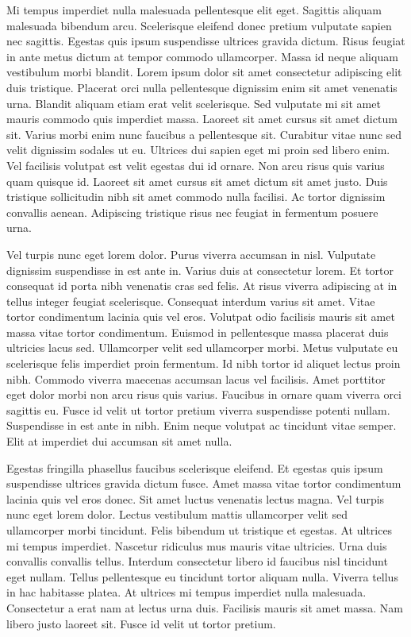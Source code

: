 \documentclass[11pt,a4paper]{article}
\begin{document}
Mi tempus imperdiet nulla malesuada pellentesque elit eget. Sagittis aliquam malesuada bibendum arcu. Scelerisque eleifend donec pretium vulputate sapien nec sagittis. Egestas quis ipsum suspendisse ultrices gravida dictum. Risus feugiat in ante metus dictum at tempor commodo ullamcorper. Massa id neque aliquam vestibulum morbi blandit. Lorem ipsum dolor sit amet consectetur adipiscing elit duis tristique. Placerat orci nulla pellentesque dignissim enim sit amet venenatis urna. Blandit aliquam etiam erat velit scelerisque. Sed vulputate mi sit amet mauris commodo quis imperdiet massa. Laoreet sit amet cursus sit amet dictum sit. Varius morbi enim nunc faucibus a pellentesque sit. Curabitur vitae nunc sed velit dignissim sodales ut eu. Ultrices dui sapien eget mi proin sed libero enim. Vel facilisis volutpat est velit egestas dui id ornare. Non arcu risus quis varius quam quisque id. Laoreet sit amet cursus sit amet dictum sit amet justo. Duis tristique sollicitudin nibh sit amet commodo nulla facilisi. Ac tortor dignissim convallis aenean. Adipiscing tristique risus nec feugiat in fermentum posuere urna.

Vel turpis nunc eget lorem dolor. Purus viverra accumsan in nisl. Vulputate dignissim suspendisse in est ante in. Varius duis at consectetur lorem. Et tortor consequat id porta nibh venenatis cras sed felis. At risus viverra adipiscing at in tellus integer feugiat scelerisque. Consequat interdum varius sit amet. Vitae tortor condimentum lacinia quis vel eros. Volutpat odio facilisis mauris sit amet massa vitae tortor condimentum. Euismod in pellentesque massa placerat duis ultricies lacus sed. Ullamcorper velit sed ullamcorper morbi. Metus vulputate eu scelerisque felis imperdiet proin fermentum. Id nibh tortor id aliquet lectus proin nibh. Commodo viverra maecenas accumsan lacus vel facilisis. Amet porttitor eget dolor morbi non arcu risus quis varius. Faucibus in ornare quam viverra orci sagittis eu. Fusce id velit ut tortor pretium viverra suspendisse potenti nullam. Suspendisse in est ante in nibh. Enim neque volutpat ac tincidunt vitae semper. Elit at imperdiet dui accumsan sit amet nulla.

Egestas fringilla phasellus faucibus scelerisque eleifend. Et egestas quis ipsum suspendisse ultrices gravida dictum fusce. Amet massa vitae tortor condimentum lacinia quis vel eros donec. Sit amet luctus venenatis lectus magna. Vel turpis nunc eget lorem dolor. Lectus vestibulum mattis ullamcorper velit sed ullamcorper morbi tincidunt. Felis bibendum ut tristique et egestas. At ultrices mi tempus imperdiet. Nascetur ridiculus mus mauris vitae ultricies. Urna duis convallis convallis tellus. Interdum consectetur libero id faucibus nisl tincidunt eget nullam. Tellus pellentesque eu tincidunt tortor aliquam nulla. Viverra tellus in hac habitasse platea. At ultrices mi tempus imperdiet nulla malesuada. Consectetur a erat nam at lectus urna duis. Facilisis mauris sit amet massa. Nam libero justo laoreet sit. Fusce id velit ut tortor pretium.
\end{document}

